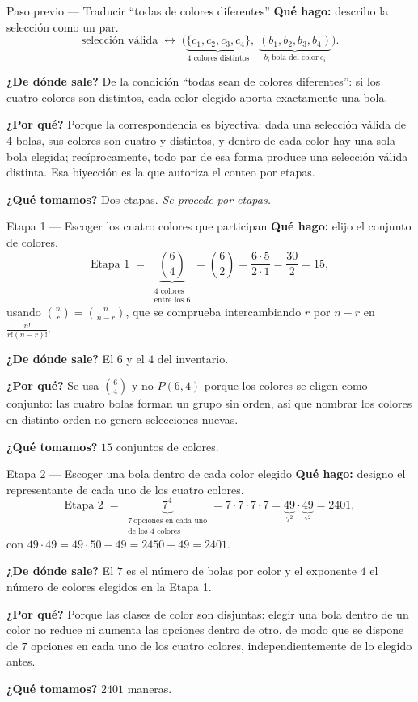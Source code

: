 \documentclass[11pt]{article}
\begin{document}
\begin{paso}{Paso previo --- Traducir ``todas de colores diferentes''}
\textbf{Qu\'e hago:} describo la selecci\'on como un par.
\[
\text{selecci\'on v\'alida}\;\longleftrightarrow\;
\Big(\underbrace{\{c_1,c_2,c_3,c_4\}}_{\text{4 colores distintos}},\;
\underbrace{(b_1,b_2,b_3,b_4)}_{b_i\ \text{bola del color}\ c_i}\Big) .
\]

\textbf{¿De d\'onde sale?} De la condici\'on ``todas sean de colores diferentes'': si los cuatro colores son
distintos, cada color elegido aporta exactamente una bola.

\textbf{¿Por qu\'e?} Porque la correspondencia es biyectiva: dada una selecci\'on v\'alida de $4$ bolas, sus
colores son cuatro y distintos, y dentro de cada color hay una sola bola elegida; rec\'iprocamente, todo par
de esa forma produce una selecci\'on v\'alida distinta. Esa biyecci\'on es la que autoriza el conteo por
etapas.

\textbf{¿Qu\'e tomamos?} Dos etapas. \emph{Se procede por etapas.}
\end{paso}

\begin{paso}{Etapa 1 --- Escoger los cuatro colores que participan}
\textbf{Qu\'e hago:} elijo el conjunto de colores.
\[
\text{Etapa 1}\;=\;\underbrace{\binom{6}{4}}_{\substack{\text{4 colores}\\ \text{entre los 6}}}
=\binom{6}{2}=\frac{6\cdot 5}{2\cdot 1}=\frac{30}{2}=15 ,
\]
usando $\binom{n}{r}=\binom{n}{n-r}$, que se comprueba intercambiando $r$ por $n-r$ en
$\frac{n!}{r!(n-r)!}$.

\textbf{¿De d\'onde sale?} El $6$ y el $4$ del inventario.

\textbf{¿Por qu\'e?} Se usa $\binom{6}{4}$ y no $P(6,4)$ porque los colores se eligen como conjunto: las
cuatro bolas forman un grupo sin orden, as\'i que nombrar los colores en distinto orden no genera
selecciones nuevas.

\textbf{¿Qu\'e tomamos?} $15$ conjuntos de colores.
\end{paso}

\begin{paso}{Etapa 2 --- Escoger una bola dentro de cada color elegido}
\textbf{Qu\'e hago:} designo el representante de cada uno de los cuatro colores.
\[
\text{Etapa 2}\;=\;\underbrace{7^4}_{\substack{7\ \text{opciones en cada uno}\\ \text{de los 4 colores}}}
=7\cdot 7\cdot 7\cdot 7=\underbrace{49}_{7^2}\cdot\underbrace{49}_{7^2}=2401 ,
\]
con $49\cdot 49=49\cdot 50-49=2450-49=2401$.

\textbf{¿De d\'onde sale?} El $7$ es el n\'umero de bolas por color y el exponente $4$ el n\'umero de
colores elegidos en la Etapa 1.

\textbf{¿Por qu\'e?} Porque las clases de color son disjuntas: elegir una bola dentro de un color no reduce
ni aumenta las opciones dentro de otro, de modo que se dispone de $7$ opciones en cada uno de los cuatro
colores, independientemente de lo elegido antes.

\textbf{¿Qu\'e tomamos?} $2401$ maneras.
\end{paso}
\end{document}
